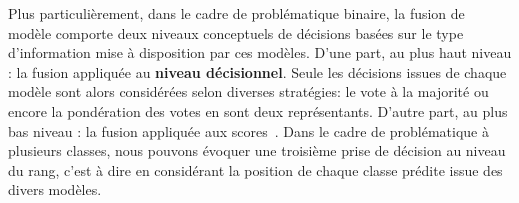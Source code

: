 Plus particulièrement, dans le cadre de problématique binaire, la fusion de modèle comporte deux niveaux conceptuels de décisions basées sur le type d'information mise à disposition par ces modèles. D'une part, au plus haut niveau : la fusion appliquée au \textbf{niveau décisionnel}. Seule les décisions issues de chaque modèle sont alors considérées selon diverses stratégies: le vote à la majorité ou encore la pondération des votes en sont deux représentants. D'autre part, au plus bas niveau : la fusion appliquée aux scores~\cite{Kittler1998}. Dans le cadre de problématique à plusieurs classes, nous pouvons évoquer une troisième prise de décision au niveau du rang, c'est à dire en considérant la position de chaque classe prédite issue des divers modèles.